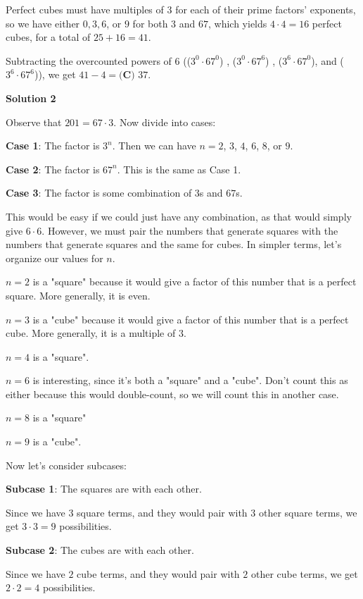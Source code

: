 \begin{enumerate}
 Perfect cubes must have multiples of $3$ for each of their prime factors' exponents, so we have either $0, 3, 6$, or $9$ for both $3$ and $67$, which yields $4\cdot4 = 16$ perfect cubes, for a total of $25+16 = 41$. 

 Subtracting the overcounted powers of $6$ (($3^0\cdot67^0$) , ($3^0\cdot67^6$) , ($3^6\cdot67^0$), and ($3^6\cdot67^6$)), we get $41-4 = \boxed{\textbf{(C) }37}$.

 



\textbf{Solution 2}

Observe that $201 = 67 \cdot 3$. Now divide into cases:

 \textbf{Case 1}: The factor is $3^n$. Then we can have $n = 2$, $3$, $4$, $6$, $8$, or $9$. 

 \textbf{Case 2}: The factor is $67^n$. This is the same as Case 1.

 \textbf{Case 3}: The factor is some combination of $3$s and $67$s.

 This would be easy if we could just have any combination, as that would simply give $6 \cdot 6$. However, we must pair the numbers that generate squares with the numbers that generate squares and the same for cubes. In simpler terms, let's organize our values for $n$.

 $n = 2$ is a "square" because it would give a factor of this number that is a perfect square. More generally, it is even.

 $n = 3$ is a "cube" because it would give a factor of this number that is a perfect cube. More generally, it is a multiple of $3$.

 $n = 4$ is a "square".

 $n = 6$ is interesting, since it's both a "square" and a "cube". Don't count this as either because this would double-count, so we will count this in another case.

 $n = 8$ is a "square"

 $n = 9$ is a "cube".

 Now let's consider subcases:

 \textbf{Subcase 1}: The squares are with each other.

 Since we have $3$ square terms, and they would pair with $3$ other square terms, we get $3 \cdot 3 = 9$ possibilities.

 \textbf{Subcase 2}: The cubes are with each other.

 Since we have $2$ cube terms, and they would pair with $2$ other cube terms, we get $2 \cdot 2 = 4$ possibilities.


\end{enumerate}
